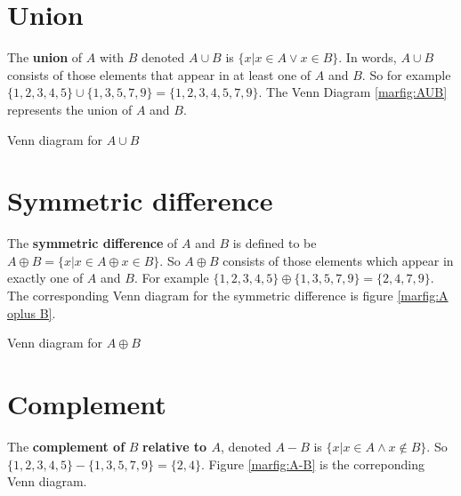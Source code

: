 \section{Union}
The { \bfseries union} of $A$ with $B$ denoted $A\cup B$ is $\{x | x\in A \vee x\in B\}$. 
In words, $A\cup B$ consists of those elements that appear in at least one of $A$ and $B$.
So for example
$\{1,2,3,4,5\}\cup \{1,3,5,7,9\}=\{1,2,3,4,5,7,9\}$. The Venn Diagram \ref{marfig:AUB}  represents
the union of $A$ and $B$.

\begin{marginfigure}[-1.5cm]
\caption{Venn diagram for $A \cup B$}\label{marfig:AUB}
\end{marginfigure}

\section{Symmetric difference}
The { \bfseries symmetric difference} of $A$ and $B$  is defined to be $A\oplus B = 
\{x | x\in A \oplus x\in B\}$. So $A\oplus B$ consists of those elements which appear
in exactly one of $A$ and $B$.
For example $\{1,2,3,4,5\}\oplus \{1,3,5,7,9\}=\{2,4,7,9\}$. The corresponding Venn diagram for the
symmetric difference is figure \ref{marfig:A oplus B}.

\begin{marginfigure}
\caption{Venn diagram for $A \oplus B$}\label{marfig:A oplus B}
\end{marginfigure}


\section{Complement}
The { \bfseries complement of} $B$ { \bfseries relative to $A$}, 
denoted $A-B$ is $\{x | x\in A \wedge x\not\in B\}$. So 
$\{1,2,3,4,5\}-\{1,3,5,7,9\}=\{2,4\}$. Figure \ref{marfig:A-B} is
the correponding Venn diagram.

